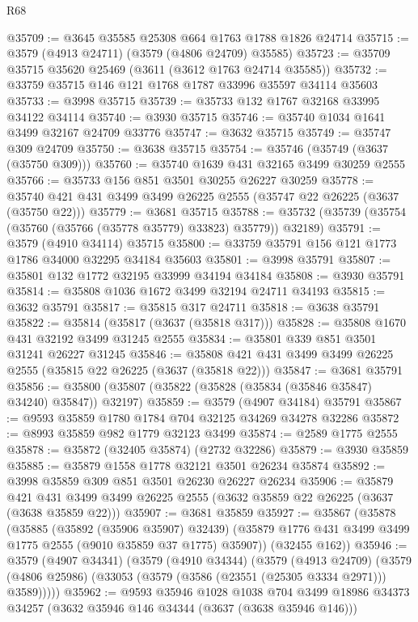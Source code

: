 \begin{lexlean}{R68}
\begin{coremodule}
@35709 := @3645 @35585 @25308 @664 @1763 @1788 @1826 @24714
@35715 := @3579 (@4913 @24711) (@3579 (@4806 @24709) @35585)
@35723 := @35709 @35715 @35620 @25469 (@3611 (@3612 @1763 @24714 @35585))
@35732 := @33759 @35715 @146 @121 @1768 @1787 @33996 @35597 @34114 @35603
@35733 := @3998 @35715
@35739 := @35733 @132 @1767 @32168 @33995 @34122 @34114
@35740 := @3930 @35715
@35746 := @35740 @1034 @1641 @3499 @32167 @24709 @33776
@35747 := @3632 @35715
@35749 := @35747 @309 @24709
@35750 := @3638 @35715
@35754 := @35746 (@35749 (@3637 (@35750 @309)))
@35760 := @35740 @1639 @431 @32165 @3499 @30259 @2555
@35766 := @35733 @156 @851 @3501 @30255 @26227 @30259
@35778 := @35740 @421 @431 @3499 @3499 @26225 @2555 (@35747 @22 @26225 (@3637 (@35750 @22)))
@35779 := @3681 @35715
@35788 := @35732 (@35739 (@35754 (@35760 (@35766 (@35778 @35779) @33823) @35779)) @32189)
@35791 := @3579 (@4910 @34114) @35715
@35800 := @33759 @35791 @156 @121 @1773 @1786 @34000 @32295 @34184 @35603
@35801 := @3998 @35791
@35807 := @35801 @132 @1772 @32195 @33999 @34194 @34184
@35808 := @3930 @35791
@35814 := @35808 @1036 @1672 @3499 @32194 @24711 @34193
@35815 := @3632 @35791
@35817 := @35815 @317 @24711
@35818 := @3638 @35791
@35822 := @35814 (@35817 (@3637 (@35818 @317)))
@35828 := @35808 @1670 @431 @32192 @3499 @31245 @2555
@35834 := @35801 @339 @851 @3501 @31241 @26227 @31245
@35846 := @35808 @421 @431 @3499 @3499 @26225 @2555 (@35815 @22 @26225 (@3637 (@35818 @22)))
@35847 := @3681 @35791
@35856 := @35800 (@35807 (@35822 (@35828 (@35834 (@35846 @35847) @34240) @35847)) @32197)
@35859 := @3579 (@4907 @34184) @35791
@35867 := @9593 @35859 @1780 @1784 @704 @32125 @34269 @34278 @32286
@35872 := @8993 @35859 @982 @1779 @32123 @3499
@35874 := @2589 @1775 @2555
@35878 := @35872 (@32405 @35874) (@2732 @32286)
@35879 := @3930 @35859
@35885 := @35879 @1558 @1778 @32121 @3501 @26234 @35874
@35892 := @3998 @35859 @309 @851 @3501 @26230 @26227 @26234
@35906 := @35879
    @421
    @431
    @3499
    @3499
    @26225
    @2555
    (@3632 @35859 @22 @26225 (@3637 (@3638 @35859 @22)))
@35907 := @3681 @35859
@35927 := @35867
    (@35878
      (@35885
        (@35892 (@35906 @35907) @32439)
        (@35879 @1776 @431 @3499 @3499 @1775 @2555 (@9010 @35859 @37 @1775) @35907))
      (@32455 @162))
@35946 := @3579
    (@4907 @34341)
    (@3579
      (@4910 @34344)
      (@3579
        (@4913 @24709)
        (@3579 (@4806 @25986) (@33053 (@3579 (@3586 (@23551 (@25305 @3334 @2971))) @3589)))))
@35962 := @9593
    @35946
    @1028
    @1038
    @704
    @3499
    @18986
    @34373
    @34257
    (@3632 @35946 @146 @34344 (@3637 (@3638 @35946 @146)))

\end{coremodule}
\end{lexlean}
